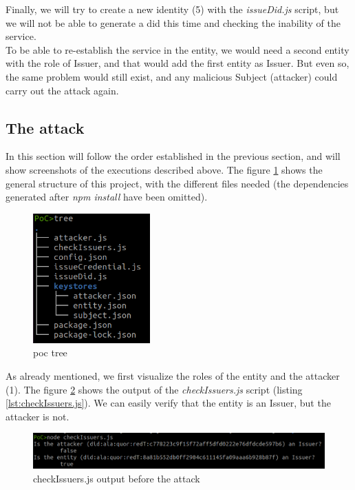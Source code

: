 \documentclass[a4paper, 12pt]{article} %
\begin{document}
        Finally, we will try to create a new identity (5) with the \textit{issueDid.js} script, but we will not be able to generate a \acrshort{did} this time and checking the inability of the service.\\
        
        To be able to re-establish the service in the entity, we would need a second entity with the role of Issuer, and that would add the first entity as Issuer. But even so, the same problem would still exist, and any malicious Subject (attacker) could carry out the attack again.
        
    \subsection{The attack}
        In this section will follow the order established in the previous section, and will show screenshots of the executions described above. The figure \ref{fig:poc-tree} shows the general structure of this project, with the different files needed (the dependencies generated after \textit{npm install} have been omitted).\\
        \begin{figure}[h]
            \centering
            \includegraphics[width=0.4\textwidth]{poc/tree.png}
            \caption{\acrshort{poc} tree}
            \label{fig:poc-tree}
        \end{figure}
        
        As already mentioned, we first visualize the roles of the entity and the attacker (1). The figure \ref{fig:poc-1} shows the output of the \textit{checkIssuers.js} script (listing \ref{lst:checkIssuers.js}). We can easily verify that the entity is an Issuer, but the attacker is not.\\
        \begin{figure}[h]
            \centering
            \includegraphics[width=1.0\textwidth]{poc/1.png}
            \caption{checkIssuers.js output before the attack}
            \label{fig:poc-1}
        \end{figure}
        
\end{document}
